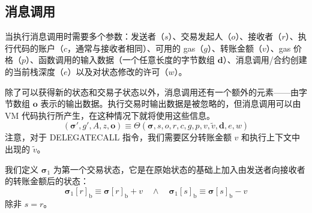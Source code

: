 \documentclass[9pt,oneside]{amsart}
\begin{document}
\begin{multicols}{2}
\section{消息调用} \label{ch:call}
当执行消息调用时需要多个参数：发送者（$s$）、交易发起人（$o$）、接收者（$r$）、执行代码的账户（$c$，通常与接收者相同）、可用的 gas（$g$）、转账金额（$v$）、gas 价格（$p$）、函数调用的输入数据（一个任意长度的字节数组 $\mathbf{d}$）、消息调用/合约创建的当前栈深度（$e$）以及对状态修改的许可（$w$）。

除了可以获得新的状态和交易子状态以外，消息调用还有一个额外的元素——由字节数组 $\mathbf{o}$ 表示的输出数据。执行交易时输出数据是被忽略的，但消息调用可以由 VM 代码执行所产生，在这种情况下就将使用这些信息。
\begin{equation}
(\boldsymbol{\sigma}', g', A, z, \mathbf{o}) \equiv \Theta(\boldsymbol{\sigma}, s, o, r, c, g, p, v, \tilde{v}, \mathbf{d}, e, w)
\end{equation}
注意，对于 {\small DELEGATECALL} 指令，我们需要区分转账金额 $v$ 和执行上下文中出现的 $\tilde{v}$。

我们定义 $\boldsymbol{\sigma}_1$ 为第一个交易状态，它是在原始状态的基础上加入由发送者向接收者的转账金额后的状态：
\begin{equation}
\boldsymbol{\sigma}_1[r]_{\mathrm{b}} \equiv \boldsymbol{\sigma}[r]_{\mathrm{b}} + v \quad\wedge\quad \boldsymbol{\sigma}_1[s]_{\mathrm{b}} \equiv \boldsymbol{\sigma}[s]_{\mathrm{b}} - v
\end{equation}
除非 $s = r$。


\end{multicols}
\end{document}
